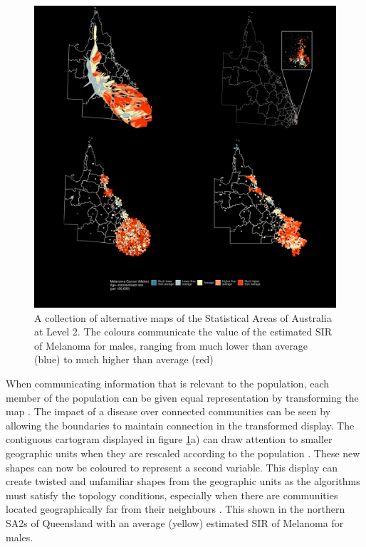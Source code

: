 \documentclass{monashthesis}
\begin{document}
\begin{figure}[H]
\centering
\includegraphics[width=14cm]{figures/03-algorithm/qld_grid.pdf}
\caption{\label{fig:qld_grid}A collection of alternative maps of the Statistical Areas of Australia at Level 2. The colours communicate the value of the estimated SIR of Melanoma for males, ranging from much lower than average (blue) to much higher than average (red)}
\end{figure}

When communicating information that is relevant to the population, each member of the population can be given equal representation by transforming the map \autocite{TVSSS}.
The impact of a disease over connected communities can be seen by allowing the boundaries to maintain connection in the transformed display. The contiguous cartogram displayed in figure \ref{fig:qld_grid}a) can draw attention to smaller geographic units when they are rescaled according to the population \autocite{DMAHP}. These new shapes can now be coloured to represent a second variable. This display can create twisted and unfamiliar shapes from the geographic units as the algorithms must satisfy the topology conditions, especially when there are communities located geographically far from their neighbours \autocite{TVSSS}. This shown in the northern SA2s of Queensland with an average (yellow) estimated SIR of Melanoma for males.
\end{document}
